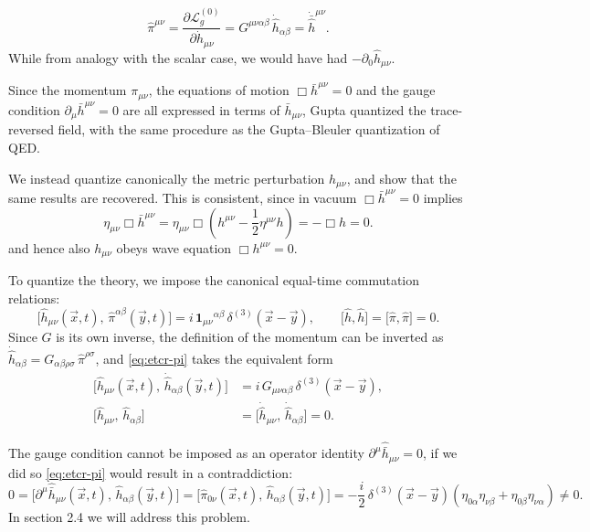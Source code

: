 \documentclass[12pt,a4paper,oneside]{article}
\numberwithin{equation}{section}   %
\begin{document}
\begin{equation}
  \hat{\pi}^{\mu\nu}
  = \frac{\partial \mathcal{L}^{(0)}_g}{\partial \dot{h}_{\mu\nu}}
  = G^{\mu\nu\alpha\beta}\, \dot{\hat{h}}_{\alpha\beta}
  = \dot{\bar{\hat{h}}}^{\mu\nu}.
\end{equation}
While from analogy with the scalar case,
we would have had $-\partial_0 \hat{h}_{\mu\nu}$.

Since the momentum $\pi_{\mu\nu}$, the equations of motion $\Box\bar h^{\mu\nu}=0$
 and the
gauge condition $\partial_\mu\bar h^{\mu\nu}=0$ are all expressed in
terms of $\bar h_{\mu\nu}$, Gupta quantized the trace-reversed field,
with the same procedure as the Gupta--Bleuler
quantization of QED.

We instead quantize canonically the metric perturbation $h_{\mu\nu}$,
 and show that the
same results are recovered. This is consistent, since in vacuum
$\Box\bar h^{\mu\nu}=0$ implies
\begin{equation}
    \eta_{\mu\nu} \Box \bar{h}^{\mu\nu}=\eta_{\mu\nu}\Box (h^{\mu\nu}-\frac12\eta^{\mu\nu}h)=-\Box h=0.
\end{equation} 
and hence also $h_{\mu\nu}$
obeys wave equation
$\Box h^{\mu\nu}=0$.

To quantize the theory, we impose the canonical equal-time commutation
relations:
\begin{equation}
  \bigl[\hat{h}_{\mu\nu}(\vec{x},t),\, \hat{\pi}^{\alpha\beta}(\vec{y},t)\bigr]
  = i\, \mathbf{1}_{\mu\nu}{}^{\alpha\beta}\, \delta^{(3)}(\vec{x}-\vec{y}),
  \qquad
  \bigl[\hat{h},\hat{h}\bigr]
  = \bigl[\hat{\pi},\hat{\pi}\bigr] = 0 .
  \label{eq:etcr-pi}
\end{equation}
Since $G$ is its own inverse, the definition of the momentum can be inverted
as $\dot{\hat{h}}_{\alpha\beta} = G_{\alpha\beta\rho\sigma}\,\hat{\pi}^{\rho\sigma}$,
and \eqref{eq:etcr-pi} takes the equivalent form
\begin{equation}
\boxed{
  \begin{aligned}
  \bigl[\hat{h}_{\mu\nu}(\vec{x},t),\, \dot{\hat{h}}_{\alpha\beta}(\vec{y},t)\bigr]
  &= i\, G_{\mu\nu\alpha\beta}\, \delta^{(3)}(\vec{x}-\vec{y}),\\[0.2cm]
  \bigl[\hat{h}_{\mu\nu},\, \hat{h}_{\alpha\beta}\bigr]
  &= \bigl[\dot{\hat{h}}_{\mu\nu},\, \dot{\hat{h}}_{\alpha\beta}\bigr] = 0 .
  \end{aligned}}
\label{eq:etcr}
\end{equation}

The gauge condition cannot be imposed as an operator identity $\partial^\mu \hat{\bar{h}}_{\mu\nu} = 0$,
if we did so \eqref{eq:etcr-pi} would result in a contraddiction:
\begin{equation}\label{GBC}
    0=\bigl[\partial^\mu\hat{\bar h}_{\mu\nu}(\vec x,t),\,\hat h_{\alpha\beta}(\vec y,t)\bigr]
    =\bigl[\hat\pi_{0\nu}(\vec x,t),\,\hat h_{\alpha\beta}(\vec y,t)\bigr]
    =-\frac{i}{2}\,\delta^{(3)}(\vec x-\vec y)
    \left(\eta_{0\alpha}\eta_{\nu\beta}+\eta_{0\beta}\eta_{\nu\alpha}\right)\neq0 .
\end{equation}
In section 2.4 we will address this problem.
\end{document}

